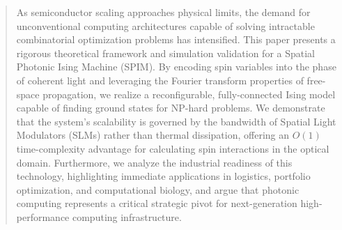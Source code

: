 \begin{abstract}
As semiconductor scaling approaches physical limits, the demand for unconventional computing architectures capable of solving intractable combinatorial optimization problems has intensified. This paper presents a rigorous theoretical framework and simulation validation for a Spatial Photonic Ising Machine (SPIM). By encoding spin variables into the phase of coherent light and leveraging the Fourier transform properties of free-space propagation, we realize a reconfigurable, fully-connected Ising model capable of finding ground states for NP-hard problems. We demonstrate that the system's scalability is governed by the bandwidth of Spatial Light Modulators (SLMs) rather than thermal dissipation, offering an $O(1)$ time-complexity advantage for calculating spin interactions in the optical domain. Furthermore, we analyze the industrial readiness of this technology, highlighting immediate applications in logistics, portfolio optimization, and computational biology, and argue that photonic computing represents a critical strategic pivot for next-generation high-performance computing infrastructure.
\end{abstract}
